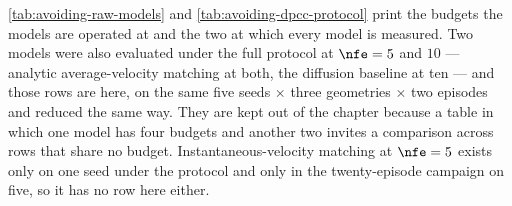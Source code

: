 \autoref{tab:avoiding-raw-models} and \autoref{tab:avoiding-dpcc-protocol} print the budgets the models
are operated at and the two at which every model is measured. Two models were also evaluated under the
full protocol at $\nfe=5$ and $10$ --- analytic average-velocity matching at both, the diffusion baseline
at ten --- and those rows are here, on the same five seeds $\times$ three geometries $\times$ two episodes
and reduced the same way. They are kept out of the chapter because a table in which one model has four
budgets and another two invites a comparison across rows that share no budget. Instantaneous-velocity
matching at $\nfe=5$ exists only on one seed under the protocol and only in the twenty-episode campaign
on five, so it has no row here either.

